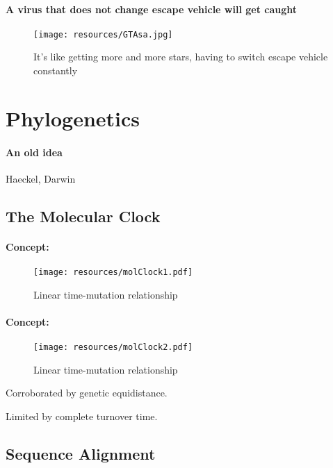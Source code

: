 \documentclass{beamer}
\begin{document}
\begin{darkframes}
    \begin{frame}{\secname}
      \framesubtitle{A virus that does not change escape vehicle will get caught}
      \begin{figure}
        \texttt{[image: resources/GTAsa.jpg]}
        \caption{\footnotesize It's like getting more and more stars, having to switch escape vehicle constantly}
      \end{figure}
    \end{frame}




  \section{Phylogenetics}

    \begin{frame}{\secname}
      \framesubtitle{An old idea}
      Haeckel, Darwin
    \end{frame}

    \subsection{The Molecular Clock}

    \begin{frame}{\secname}
      \framesubtitle{Concept: \subsecname}
      \begin{figure}
        \texttt{[image: resources/molClock1.pdf]}
        \caption{\footnotesize Linear time-mutation relationship}
      \end{figure}
    \end{frame}


    \begin{frame}{\secname}
      \framesubtitle{Concept: \subsecname}
      \begin{figure}
        \texttt{[image: resources/molClock2.pdf]}
        \caption{\footnotesize Linear time-mutation relationship}
      \end{figure}
      \vspace*{-.2cm}
      Corroborated by genetic equidistance.

      Limited by complete turnover time.
    \end{frame}

    \subsection{Sequence Alignment}


\end{darkframes}
\end{document}
